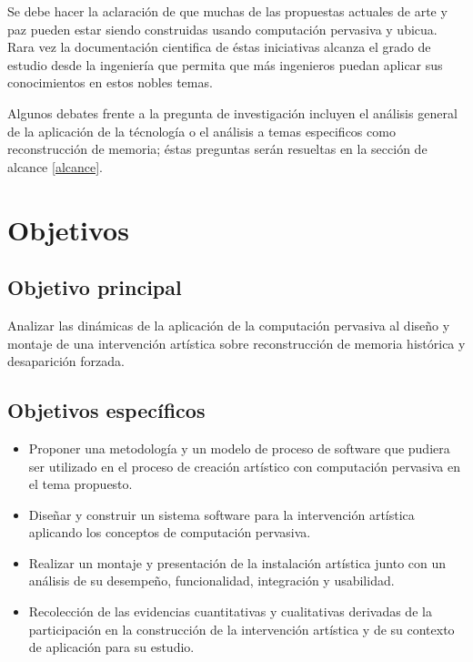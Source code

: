 Se debe hacer la aclaración de que muchas de las propuestas actuales de arte y paz pueden estar siendo construidas usando computación pervasiva y ubicua. Rara vez la documentación cientifica de éstas iniciativas alcanza el grado de estudio desde la ingeniería que permita que más ingenieros puedan aplicar sus conocimientos en estos nobles temas.

Algunos debates frente a la pregunta de investigación incluyen el análisis general de la aplicación de la técnología o el análisis a temas especificos como reconstrucción de memoria; éstas preguntas serán resueltas en la sección de alcance \ref{alcance}.

\section{Objetivos}

\subsection{Objetivo principal}

Analizar las dinámicas de la aplicación de la computación pervasiva al diseño y montaje de una intervención artística sobre reconstrucción de memoria histórica y desaparición forzada.

\subsection{Objetivos específicos}

\begin{itemize}

    \item Proponer una metodología y un modelo de proceso de software que pudiera ser utilizado en el proceso de creación artístico con computación pervasiva en el tema propuesto.

    \item Diseñar y construir un sistema software para la intervención artística aplicando los conceptos de computación pervasiva.

    \item Realizar un montaje y presentación de la instalación artística junto con un análisis de su desempeño, funcionalidad, integración y usabilidad.

    \item Recolección de las evidencias cuantitativas y cualitativas derivadas de la participación en la construcción de la intervención artística y de su contexto de aplicación para su estudio.

\end{itemize}

